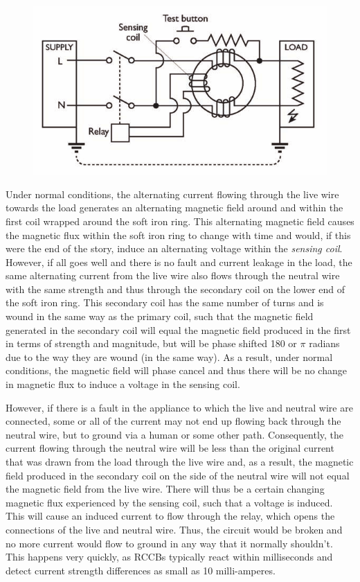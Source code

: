 \begin{figure}[h!]
	\centering
	\includegraphics[scale=0.7]{img/rccb}
\end{figure}

Under normal conditions, the alternating current flowing through the live wire towards the load generates an alternating magnetic field around and within the first coil wrapped around the soft iron ring. This alternating magnetic field causes the magnetic flux within the soft iron ring to change with time and would, if this were the end of the story, induce an alternating voltage within the \emph{sensing coil}. However, if all goes well and there is no fault and current leakage in the load, the same alternating current from the live wire also flows through the neutral wire with the same strength and thus through the secondary coil on the lower end of the soft iron ring. This secondary coil has the same number of turns and is wound in the same way as the primary coil, such that the magnetic field generated in the secondary coil will equal the magnetic field produced in the first in terms of strength and magnitude, but will be phase shifted 180\degree{} or $\pi$ radians due to the way they are wound (in the same way). As a result, under normal conditions, the magnetic field will phase cancel and thus there will be no change in magnetic flux to induce a voltage in the sensing coil. 

However, if there is a fault in the appliance to which the live and neutral wire are connected, some or all of the current may not end up flowing back through the neutral wire, but to ground via a human or some other path. Consequently, the current flowing through the neutral wire will be less than the original current that was drawn from the load through the live wire and, as a result, the magnetic field produced in the secondary coil on the side of the neutral wire will not equal the magnetic field from the live wire. There will thus be a certain changing magnetic flux experienced by the sensing coil, such that a voltage is induced. This will cause an induced current to flow through the relay, which opens the connections of the live and neutral wire. Thus, the circuit would be broken and no more current would flow to ground in any way that it normally shouldn't. This happens very quickly, as RCCBs typically react within milliseconds and detect current strength differences as small as 10 milli-amperes. 

